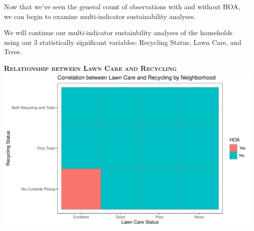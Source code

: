 \documentclass{article}
\begin{document}
Now that we've seen the general count of observations with and without HOA, we can begin to examine multi-indicator sustainability analyses.




We will continue our multi-indicator sustainbility analyses of the households using our 3 statistically significant variables: Recycling Status, Lawn Care, and Trees.

\newpage
\textsc{\textbf{Relationship between Lawn Care and Recycling}}
\newline
\newline
\includegraphics{exam22-027}
\end{document}
